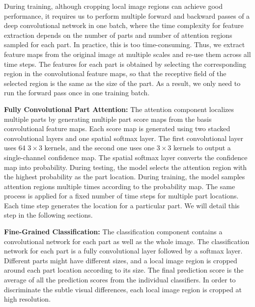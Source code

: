 \documentclass[10pt,twocolumn,letterpaper]{article}
\begin{document}
During training, although cropping local image regions can achieve good performance, it requires us to perform multiple forward and backward passes of a deep convolutional network in one batch, where the time complexity for feature extraction depends on the number of parts and number of attention regions sampled for each part.
In practice, this is too time-consuming.
Thus, we extract feature maps from the original image at multiple scales and re-use them across all time steps.
The features for each part is obtained by selecting the corresponding region in the convolutional feature maps, so that the receptive field of the selected region is the same as the size of the part.
As a result, we only need to run the forward pass once in one training batch.

\textbf{Fully Convolutional Part Attention:}
The attention component localizes multiple parts by generating multiple part score maps from the basis convolutional feature maps.
Each score map is generated using two stacked convolutional layers and one spatial softmax layer.
The first convolutional layer uses 64 $3\times3$ kernels, and the second one uses one $3\times3$ kernels to output a single-channel confidence map.
The spatial softmax layer converts the confidence map into probability.
During testing, the model selects the attention region with the highest probability as the part location.
During training, the model samples attention regions multiple times according to the probability map.
The same process is applied for a fixed number of time steps for multiple part locations.
Each time step generates the location for a particular part.
We will detail this step in the following sections.

\textbf{Fine-Grained Classification:}
The classification component contains a convolutional network for each part as well as the whole image.
The classification network for each part is a fully convolutional layer followed by a softmax layer.
Different parts might have different sizes, and a local image region is cropped around each part location according to its size.
The final prediction score is the average of all the prediction scores from the individual classifiers.
In order to discriminate the subtle visual differences, each local image region is cropped at high resolution.

\end{document}
